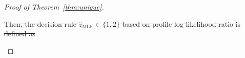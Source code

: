 \documentclass[lettersize,onecolumn,journal]{IEEEtran}
\theoremstyle{definition}
\theoremstyle{definition}
\providecommand{\DIFdeltex}[1]{{\protect\color{red}\sout{#1}}}                      %
\providecommand{\DIFdel}[1]{\texorpdfstring{\DIFdeltex{#1}}{}} %
\begin{document}
\begin{proof}[Proof of Theorem~\ref{thm:unique}]
\begin{enumerate}[wide]
\DIFdel{Then, the decision rule $\hat z_{\text{MLE}} \in\{1,2\}$ based on profile log-likelihood ratio is defined as
}%


\end{enumerate}
\end{proof}
\end{document}
